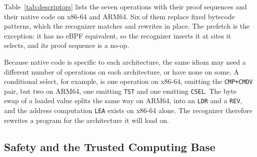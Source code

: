 Table~\ref{tab:descriptors} lists the seven operations with their proof sequences and their native code on x86-64 and ARM64.
Six of them replace fixed bytecode patterns, which the recognizer matches and rewrites in place.
The prefetch is the exception: it has no eBPF equivalent, so the recognizer inserts it at sites it selects, and its proof sequence is a no-op.

Because native code is specific to each architecture, the same idiom may need a different number of \lang operations on each architecture, or have none on some.
A conditional select, for example, is one \lang operation on x86-64, emitting the \texttt{CMP+CMOV} pair, but two on ARM64, one emitting \texttt{TST} and one emitting \texttt{CSEL}.
The byte swap of a loaded value splits the same way on ARM64, into an \texttt{LDR} and a \texttt{REV}, and the address computation \texttt{LEA} exists on x86-64 alone.
The recognizer therefore rewrites a program for the architecture it will load on.



\subsection{Safety and the Trusted Computing Base}
\label{subsec:safety}


